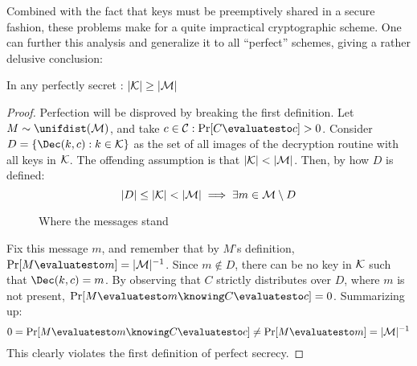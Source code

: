 
Combined with the fact that keys must be preemptively shared in a secure fashion, these problems make for a quite impractical cryptographic scheme. One can further this analysis and generalize it to all ``perfect'' schemes, giving a rather delusive conclusion:

\begin{theorem}
    In any perfectly secret \ske{}: $|\mathcal{K}| \geq |\mathcal{M}|$
\end{theorem}
\begin{proof}
    Perfection will be disproved by breaking the first definition. Let $M \sim \unifdist(\M)$, and take $c \in \C : \Pr[C \evaluatesto c] > 0$. Consider $D = \{\Dec(k, c) : k \in \K\}$ as the set of all images of the decryption routine with all keys in $\mathcal{K}$. The offending assumption is that $|\mathcal{K}| < |\mathcal{M}|$. Then, by how $D$ is defined:
    \[
        |D| \leq |\mathcal{K}| < |\mathcal{M}| \implies \exists m \in \mathcal{M} \setminus D
    \]

    \begin{figure}[h]
        \centering
        \def\firstcircle{(0,0) circle (1.5cm)}
        \def\secondcircle{(60:0) circle (0.9cm)}
        \caption{Where the messages stand}
    \end{figure}

    Fix this message $m$, and remember that by $M$'s definition, $\Pr[M \evaluatesto m] = |\M|^{-1}$. Since $m \notin D$, there can be no key in $\mathcal{K}$ such that $\Dec(k, c) = m$. By observing that $C$ strictly distributes over $D$, where $m$ is not present, $\Pr[M \evaluatesto m \knowing C \evaluatesto c] = 0$. Summarizing up:
    \[
        0 = \Pr[M \evaluatesto m \knowing C \evaluatesto c] \neq \Pr[M \evaluatesto m] = |\M|^{-1}
    \]
    This clearly violates the first definition of perfect secrecy.
\end{proof}
